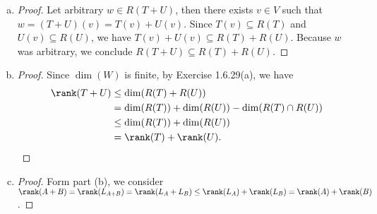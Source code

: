 \begin{Exercise}
	\begin{enumerate}[(a)]
		\item
		\begin{proof}
			Let arbitrary $w\in R(T+U)$, then there exists $v\in V$ such that $w=(T+U)(v) = T(v)+U(v)$. Since $T(v) \subseteq R(T)$ and $U(v) \subseteq R(U)$, we have $T(v)+U(v) \subseteq R(T)+R(U)$. Because $w$ was arbitrary, we conclude $R(T+U)\subseteq R(T)+R(U)$.
		\end{proof}
		
		\item
		\begin{proof}
			Since $\dim(W)$ is finite, by Exercise 1.6.29(a), we have
			\begin{align*}
			\rank(T+U)
			&\leq \dim(R(T)+R(U)) \\
			&= \dim(R(T)) + \dim(R(U)) - \dim(R(T)\cap R(U)) \\
			&\leq \dim(R(T)) + \dim(R(U)) \\
			&= \rank(T)+\rank(U).
			\end{align*}
		\end{proof}
		
		\item
		\begin{proof}
			Form part (b), we consider $\rank(A+B) = \rank(L_{A+B}) = \rank(L_A+L_B) \leq \rank(L_A) + \rank(L_B) = \rank(A) + \rank(B)$.
		\end{proof}
		
	\end{enumerate}
\end{Exercise}